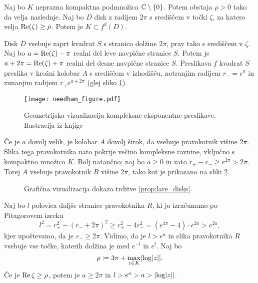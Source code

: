 \begin{trditev} \label{prop:lare_disks}
    Naj bo \(K\) neprazna kompaktna podmnožica \(\mathbb C \setminus \left\{ 0 \right\}\). Potem obstaja \(\rho > 0\) tako da velja naslednje. Naj bo \(D\) disk z radijem \(2 \pi\) s središčem v točki \(\zeta\), za katero velja \(\operatorname{Re} (\zeta) \geq \rho\). Potem je \(K \subset f^2 (D)\).
\end{trditev}

\begin{dokaz}
    Disk \(D\) vsebuje zaprt kvadrat \(S\) s stranico dolžine \(2 \pi\), prav tako s središčem v \(\zeta\). Naj bo \(a = \operatorname{Re} (\zeta) - \pi\) realni del leve navpične stranice \(S\). Potem je \(a + 2 \pi = \operatorname{Re} (\zeta) + \pi\) realni del desne navpične stranice \(S\). Preslikava \(f\) kvadrat \(S\) preslika v krožni kolobar \(A\) s središčem v izhodišču, notranjim radijem \(r_{-} = e^a\) in zunanjim radijem \(r_{+} e^{a + 2 \pi}\) (glej sliko \ref{fig:exponential}).
    \begin{figure}
        \centering
        \texttt{[image: needham\_figure.pdf]}
        \caption[Geometrijsko delovanje kompleksne eksponentne preslikave]{Geometrijska vizualizacija kompleksne eksponentne preslikave. Ilustracija iz knjige \cite{Needham_1997}}
        \label{fig:exponential}
    \end{figure}
    Če je \(a\) dovolj velik, je kolobar \(A\) dovolj širok, da vsebuje pravokotnik višine \(2 \pi\). Slika tega pravokotnika nato pokrije večino kompleksne ravnine, vključno s kompaktno množico \(K\). Bolj natančno; naj bo \(a \geq 0\) in zato \(r_+ - r_- \geq e^{2 \pi} > 2 \pi\). Torej \(A\) vsebuje pravokotnik \(R\) višine \(2 \pi\), tako kot je prikazano na sliki \ref{fig:transitivity}.
    \begin{figure}%
        \centering
        
        \caption{Grafična vizualizacija dokaza trditve \ref{prop:lare_disks}.}
        \label{fig:transitivity}
    \end{figure}
    Naj bo \(l\) polovica daljše stranice pravokotnika \(R\), ki jo izračunamo po Pitagorovem izreku
    \[l^2 = r_+^2 - (r_- + 2 \pi)^2 \geq r_+^2 - 4 r_-^2 = (e^{4 \pi} - 4) \cdot e^{2 a} > e^{2 a},\]
    kjer upoštevamo, da je \(r_- \geq 2 \pi\). Vidimo, da je \(l > e^a\) in slika pravokotnika \(R\) vsebuje vse točke, katerih dolžina je med \(e^{- l}\) in \(e^l\). Naj bo
    \[\rho \coloneq 3 \pi + \max_{z \in K} \abs{ \log \abs{z} }.\]
    Če je \(\operatorname{Re} \zeta \geq \rho\), potem je \(a \geq 2 \pi\) in \(l > e^a > a > \abs{\log \abs{z}}\).
\end{dokaz}


